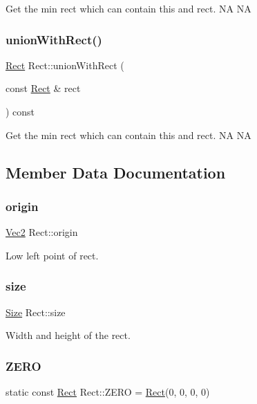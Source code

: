 Get the min rect which can contain this and rect.  NA  NA \mbox{\label{classRect_ab51a6068a355a826faa0bd03c381f1fa}} 
\subsubsection{\texorpdfstring{union\+With\+Rect()}{unionWithRect()}\hspace{0.1cm}{\footnotesize\ttfamily [2/2]}}
{\footnotesize\ttfamily \hyperlink{classRect}{Rect} Rect\+::union\+With\+Rect (\begin{DoxyParamCaption}\item[{const \hyperlink{classRect}{Rect} \&}]{rect }\end{DoxyParamCaption}) const}

Get the min rect which can contain this and rect.  NA  NA 

\subsection{Member Data Documentation}
\mbox{\label{classRect_a44eeaed15ccbe8bc0427c4918bb64e97}} 
\subsubsection{\texorpdfstring{origin}{origin}}
{\footnotesize\ttfamily \hyperlink{classVec2}{Vec2} Rect\+::origin}

Low left point of rect. \mbox{\label{classRect_a997eb36f3e6c8c4428839a1550f2e4e1}} 
\subsubsection{\texorpdfstring{size}{size}}
{\footnotesize\ttfamily \hyperlink{classSize}{Size} Rect\+::size}

Width and height of the rect. \mbox{\label{classRect_a590be46e60027b2ca0f62a457f91a83e}} 
\subsubsection{\texorpdfstring{Z\+E\+RO}{ZERO}}
{\footnotesize\ttfamily static const \hyperlink{classRect}{Rect} Rect\+::\+Z\+E\+RO = \hyperlink{classRect}{Rect}(0, 0, 0, 0)\hspace{0.3cm}{\ttfamily [static]}}

